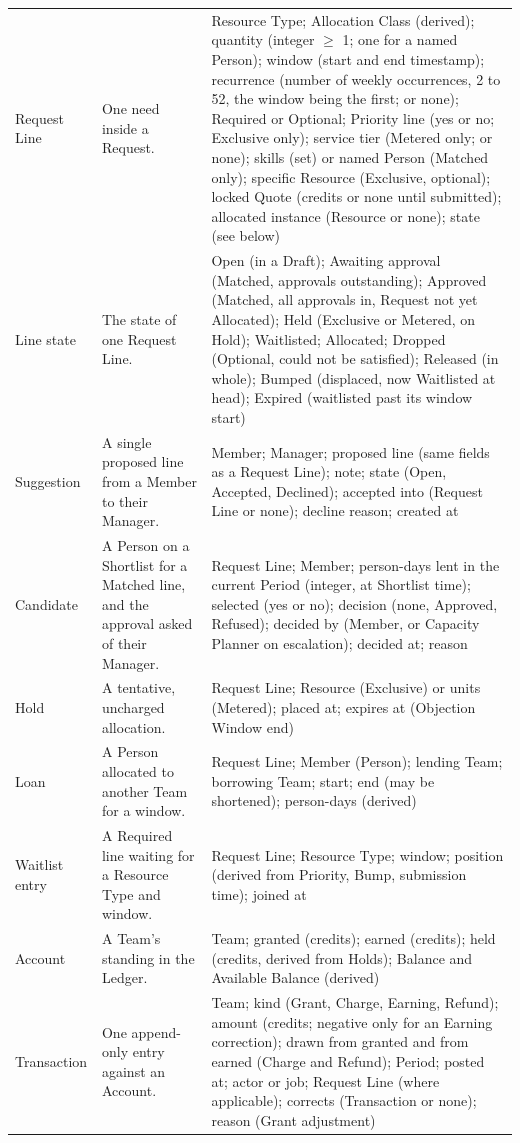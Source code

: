 {\begin{longtable}{@{}L{2.9cm}L{7.2cm}L{5.4cm}@{}}
Request Line & One need inside a Request. & Resource Type; Allocation Class (derived); quantity (integer $\ge$ 1; one for a named Person); window (start and end timestamp); recurrence (number of weekly occurrences, 2 to 52, the window being the first; or none); Required or Optional; Priority line (yes or no; Exclusive only); service tier (Metered only; or none); skills (set) or named Person (Matched only); specific Resource (Exclusive, optional); locked Quote (credits or none until submitted); allocated instance (Resource or none); state (see below) \\
Line state & The state of one Request Line. & Open (in a Draft); Awaiting approval (Matched, approvals outstanding); Approved (Matched, all approvals in, Request not yet Allocated); Held (Exclusive or Metered, on Hold); Waitlisted; Allocated; Dropped (Optional, could not be satisfied); Released (in whole); Bumped (displaced, now Waitlisted at head); Expired (waitlisted past its window start) \\
Suggestion & A single proposed line from a Member to their Manager. & Member; Manager; proposed line (same fields as a Request Line); note; state (Open, Accepted, Declined); accepted into (Request Line or none); decline reason; created at \\
Candidate & A Person on a Shortlist for a Matched line, and the approval asked of their Manager. & Request Line; Member; person-days lent in the current Period (integer, at Shortlist time); selected (yes or no); decision (none, Approved, Refused); decided by (Member, or Capacity Planner on escalation); decided at; reason \\
Hold & A tentative, uncharged allocation. & Request Line; Resource (Exclusive) or units (Metered); placed at; expires at (Objection Window end) \\
Loan & A Person allocated to another Team for a window. & Request Line; Member (Person); lending Team; borrowing Team; start; end (may be shortened); person-days (derived) \\
Waitlist entry & A Required line waiting for a Resource Type and window. & Request Line; Resource Type; window; position (derived from Priority, Bump, submission time); joined at \\
Account & A Team's standing in the Ledger. & Team; granted (credits); earned (credits); held (credits, derived from Holds); Balance and Available Balance (derived) \\
Transaction & One append-only entry against an Account. & Team; kind (Grant, Charge, Earning, Refund); amount (credits; negative only for an Earning correction); drawn from granted and from earned (Charge and Refund); Period; posted at; actor or job; Request Line (where applicable); corrects (Transaction or none); reason (Grant adjustment) \\

\end{longtable}}
